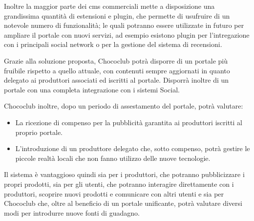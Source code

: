 Inoltre la maggior parte dei \gls{cms} commerciali mette a disposizione una grandissima quantità di estensioni e plugin, che permette di usufruire di un notevole numero di funzionalità; le quali potranno essere utilizzate in futuro per ampliare il portale con nuovi servizi, ad esempio esistono plugin per l'intregazione con i principali social network o per la gestione del sistema di recensioni.

Grazie alla soluzione proposta, Chococlub potrà disporre di un portale più fruibile rispetto a quello attuale, con contenuti sempre aggiornati in quanto delegato ai produttori associati ed iscritti al portale. Disporrà inoltre di un portale con una completa integrazione con i sistemi Social. 

Chococlub inoltre, dopo un periodo di assestamento del portale, potrà valutare: 
\begin{itemize}
	\item La ricezione di compenso per la pubblicità garantita ai produttori iscritti al proprio portale.
	\item L'introduzione di un produttore delegato che, sotto compenso, potrà gestire le piccole realtà locali che non fanno utilizzo delle nuove tecnologie.
\end{itemize}

Il sistema è vantaggioso quindi sia per i produttori, che potranno pubblicizzare i propri prodotti, sia per gli utenti, che potranno interagire direttamente con i produttori, scoprire nuovi prodotti e comunicare con altri utenti e sia per Chococlub che, oltre al beneficio di un portale unificante, potrà valutare diversi modi per introdurre nuove fonti di guadagno.





